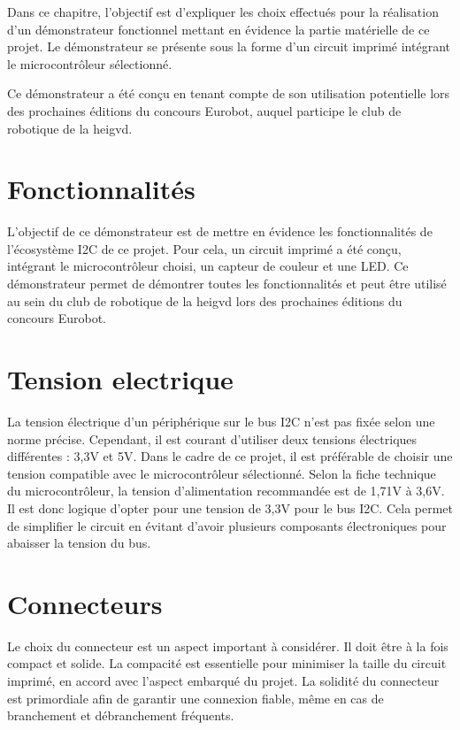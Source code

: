 Dans ce chapitre, l'objectif est d'expliquer les choix effectués pour la réalisation d'un démonstrateur fonctionnel mettant en évidence la partie matérielle de ce projet.
Le démonstrateur se présente sous la forme d'un circuit imprimé intégrant le microcontrôleur sélectionné.

Ce démonstrateur a été conçu en tenant compte de son utilisation potentielle lors des prochaines éditions du concours Eurobot, auquel participe le club de robotique de la \gls{heigvd}.

\section{Fonctionnalités}

L'objectif de ce démonstrateur est de mettre en évidence les fonctionnalités de l'écosystème I2C de ce projet.
Pour cela, un circuit imprimé a été conçu, intégrant le microcontrôleur choisi, un capteur de couleur et une LED.
Ce démonstrateur permet de démontrer toutes les fonctionnalités et peut être utilisé au sein du club de robotique de la \gls{heigvd} lors des prochaines éditions du concours Eurobot.

\section{Tension electrique}

La tension électrique d'un périphérique sur le bus I2C n'est pas fixée selon une norme précise.
Cependant, il est courant d'utiliser deux tensions électriques différentes : 3,3V et 5V.
Dans le cadre de ce projet, il est préférable de choisir une tension compatible avec le microcontrôleur sélectionné.
Selon la fiche technique du microcontrôleur, la tension d'alimentation recommandée est de 1,71V à 3,6V.
Il est donc logique d'opter pour une tension de 3,3V pour le bus I2C.
Cela permet de simplifier le circuit en évitant d'avoir plusieurs composants électroniques pour abaisser la tension du bus.

\section{Connecteurs}

Le choix du connecteur est un aspect important à considérer.
Il doit être à la fois compact et solide.
La compacité est essentielle pour minimiser la taille du circuit imprimé, en accord avec l'aspect embarqué du projet.
La solidité du connecteur est primordiale afin de garantir une connexion fiable, même en cas de branchement et débranchement fréquents.

